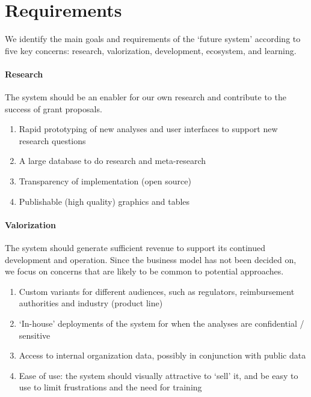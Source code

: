 \documentclass[a4paper]{article}
\begin{document}
\section{Requirements}

We identify the main goals and requirements of the `future system' according to five key concerns: research, valorization, development, ecosystem, and learning.

\paragraph{Research}
The system should be an enabler for our own research and contribute to the success of grant proposals.
\begin{enumerate}[label=R\arabic*]
\item\label{rPrototyping} Rapid prototyping of new analyses and user interfaces to support new research questions
\item\label{rDatabase} A large database to do research and meta-research
\item\label{rTransparency} Transparency of implementation (open source)
\item\label{rPublishable} Publishable (high quality) graphics and tables 
\end{enumerate}

\paragraph{Valorization}
The system should generate sufficient revenue to support its continued development and operation.
Since the business model has not been decided on, we focus on concerns that are likely to be common to potential approaches.
\begin{enumerate}[label=V\arabic*]
\item\label{vProductLine} Custom variants for different audiences, such as regulators, reimbursement authorities and industry (product line)
\item\label{vInHouse} `In-house' deployments of the system for when the analyses are confidential / sensitive
\item\label{vSilo} Access to internal organization data, possibly in conjunction with public data
\item\label{vEaseOfUse} Ease of use: the system should visually attractive to `sell' it, and be easy to use to limit frustrations and the need for training
\end{enumerate}
\end{document}
